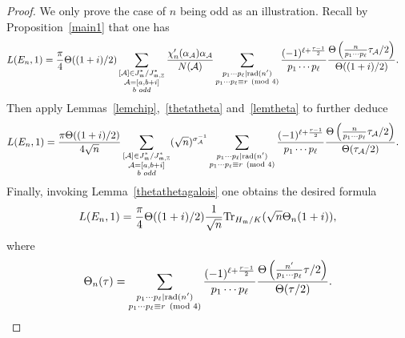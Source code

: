 \documentclass[11pt, reqno]{amsart}
\theoremstyle{plain}
\theoremstyle{definition}
\numberwithin{equation}{section}
\begin{document}
\begin{proof}
We only prove the case of $n$ being odd as an illustration. Recall by Proposition~\ref{main1} that one has
\begin{align*}
    &L(E_{n},1)=\frac{\pi}{4}\Theta((1+i)/2)\sum_{\substack{[\mathcal{A}]\in J_{\mathfrak{m}}^{*}/J_{\mathfrak{m},\mathbb{Z}}^{*}\\\mathcal{A}=[a,b+i]\\b\,\,odd}}\frac{\chi'_{n}(\alpha_{\mathcal{A}})\alpha_{\mathcal{A}}}{N(\mathcal{A})}\sum_{\substack{p_{1}\cdots p_{\ell}|{\rm rad}(n')\\ p_{1}\cdots p_{\ell}\equiv r\pmod{4}}}\frac{(-1)^{\ell+\frac{r-1}{2}}}{p_{1}\cdots p_{\ell}}\frac{\Theta\left(\frac{n}{p_{1}\cdots p_{\ell}}\tau_{\mathcal{A}}/2\right)}{\Theta((1+i)/2)}.
    \end{align*}
Then apply Lemmas~\ref{lemchip},~\ref{thetatheta} and~\ref{lemtheta} to further deduce
\begin{align*}    
&L(E_{n},1)
=\frac{\pi\Theta((1+i)/2)}{4\sqrt{n}}\sum_{\substack{[\mathcal{A}]\in J_{\mathfrak{m}}^{*}/J_{\mathfrak{m},\mathbb{Z}}^{*}\\\mathcal{A}=[a,b+i]\\b\,\,odd}}(\sqrt{n})^{\sigma_{\mathcal{A}}^{-1}}\sum_{\substack{p_{1}\cdots p_{\ell}|{\rm rad}(n')\\ p_{1}\cdots p_{\ell}\equiv r\pmod{4}}}\frac{(-1)^{\ell+\frac{r-1}{2}}}{p_{1}\cdots p_{\ell}}\frac{\Theta\left(\frac{n}{p_{1}\cdots p_{\ell}}\tau_{\mathcal{A}}/2\right)}{\Theta(\tau_{\mathcal{A}}/2)}.
\end{align*}
Finally, invoking Lemma~\ref{thetathetagalois} one obtains the desired formula
$$
L(E_{n},1)=
    \displaystyle{\frac{\pi}{4}\Theta((1+i)/2)\frac{1}{\sqrt{n}}{\rm Tr}_{H_{\mathfrak{m}}/K}(\sqrt{n}\Theta_{n}(1+i))},
$$
  where
    $$
    \Theta_{n}(\tau)=\sum_{\substack{p_{1}\cdots p_{\ell}|{\rm rad}(n')\\ p_{1}\cdots p_{\ell}\equiv r\pmod{4}}}\frac{(-1)^{\ell+\frac{r-1}{2}}}{p_{1}\cdots p_{\ell}}\frac{\Theta\left(\frac{n'}{p_{1}\cdots p_{\ell}}\tau/2\right)}{\Theta(\tau/2)}.
    $$


    
\end{proof}
\end{document}
